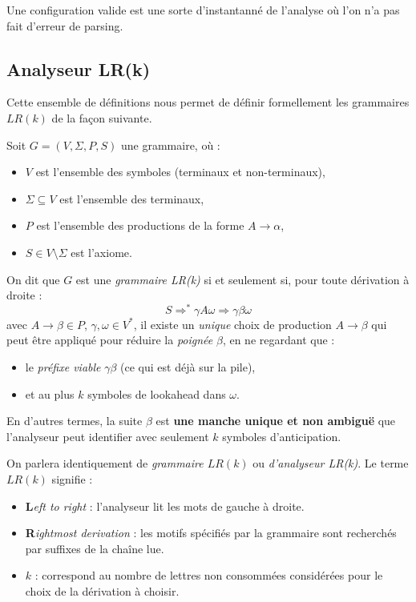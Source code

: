 Une configuration valide est une sorte d'instantanné de l'analyse où l'on n'a pas fait d'erreur de parsing. 

\subsection{Analyseur LR(k)}

Cette ensemble de définitions nous permet de définir formellement les grammaires $LR(k)$ de la 
façon suivante. 

\begin{definition}[Grammaire $LR(k)$]
    Soit \(G = (V, \Sigma, P, S)\) une grammaire, où :
    \begin{itemize}
        \item \(V\) est l'ensemble des symboles (terminaux et non-terminaux),
        \item \(\Sigma \subseteq V\) est l'ensemble des terminaux,
        \item \(P\) est l'ensemble des productions de la forme \(A \to \alpha\),
        \item \(S \in V \setminus \Sigma\) est l'axiome.
    \end{itemize}

    On dit que \(G\) est une \emph{grammaire LR(k)} si et seulement si,
    pour toute dérivation à droite :
    \[
    S \Rightarrow^{*} \gamma A \omega \Rightarrow \gamma \beta \omega
    \]
    avec \(A \to \beta \in P\), \(\gamma,\omega \in V^{*}\),
    il existe un \emph{unique} choix de production \(A \to \beta\) qui peut être appliqué
    pour réduire la \emph{poignée} \(\beta\),
    en ne regardant que :
    \begin{itemize}
        \item le \emph{préfixe viable} \(\gamma \beta\) (ce qui est déjà sur la pile),
        \item et au plus \(k\) symboles de lookahead dans \(\omega\).
    \end{itemize}

    En d'autres termes, la suite \(\beta\) est \textbf{une manche unique et non ambiguë}
    que l'analyseur peut identifier avec seulement \(k\) symboles d'anticipation.
\end{definition}

\begin{remark}
    On parlera identiquement de \emph{grammaire $LR(k)$} ou \emph{d'analyseur LR(k)}. 
    Le terme $LR(k)$ signifie : 
    \begin{itemize}
        \item \textbf{L}\emph{eft to right} : l'analyseur lit les mots de gauche à droite. 
        \item \textbf{R}\emph{ightmost derivation} : les motifs spécifiés par la grammaire sont recherchés par suffixes 
        de la chaîne lue. 
        \item $k$ : correspond au nombre de lettres non consommées considérées pour le choix de la dérivation à choisir. 
    \end{itemize}
\end{remark}

